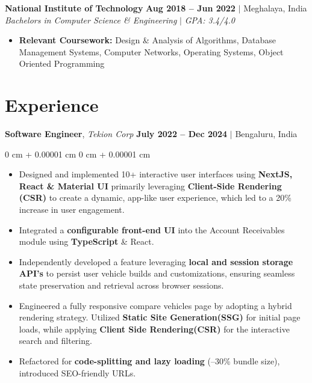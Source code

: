 \documentclass[10pt, letterpaper]{article}
\newenvironment{highlights}{
    \begin{itemize}[
        topsep=0.10 cm,     %
        parsep=0.10 cm,     %
        partopsep=0pt,      %
        itemsep=0pt,        %
        leftmargin=0 cm + 10pt  %
    ]
}{
    \end{itemize}
}
\newenvironment{onecolentry}{
    \begin{adjustwidth}{
        0 cm + 0.00001 cm
    }{
        0 cm + 0.00001 cm
    }
}{
    \end{adjustwidth}
}
\begin{document}
        \vspace{0.1cm}
        
        \noindent
        \textbf{National Institute of Technology} \hfill {\color{darkgray}\small{\textbf{Aug 2018 – Jun 2022} $|$ Meghalaya, India}} \\
        {\color{darkgray}\textit{Bachelors in Computer Science \& Engineering}} $|$ \textit{GPA: 3.4/4.0}
        \begin{highlights}
            \item \textbf{Relevant Coursework:} Design \& Analysis of Algorithms, Database Management Systems, Computer Networks, Operating Systems, Object Oriented Programming
        \end{highlights}



    
    \section{Experience}

        \noindent
        \textbf{Software Engineer}, {\color{darkgray}\textit{Tekion Corp}} \hfill {\color{darkgray}\small{\textbf{July 2022 – Dec 2024} $|$ Bengaluru, India }}

        \vspace{0.20 cm}
        \begin{onecolentry}
            \begin{highlights}
                \item Designed and implemented 10+ interactive user interfaces using \textbf{NextJS, React \& Material UI} primarily leveraging \textbf{Client-Side Rendering (CSR)} to create a dynamic, app-like user experience, which led to a 20\% increase in user engagement.
                \item Integrated a \textbf{configurable front-end UI} into the Account Receivables module using \textbf{TypeScript} \& React.
                \item Independently developed a feature leveraging \textbf{local and session storage API's} to persist user vehicle builds and customizations, ensuring seamless state preservation and retrieval across browser sessions.
                \item Engineered a fully responsive compare vehicles page by adopting a hybrid rendering strategy. Utilized \textbf{Static Site Generation(SSG)} for initial page loads, while applying \textbf{Client Side Rendering(CSR)} for the interactive search and filtering.
                \item Refactored for \textbf{code-splitting and lazy loading} (–30\% bundle size), introduced SEO-friendly URLs.
            \end{highlights}
        \end{onecolentry}
\end{document}
